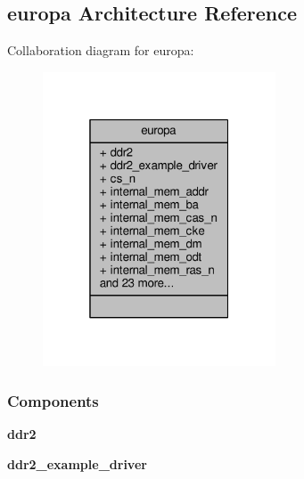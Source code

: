 \subsection{europa Architecture Reference}
\label{classddr2__example__top_1_1europa}


Collaboration diagram for europa\+:\nopagebreak
\begin{figure}[H]
\begin{center}
\leavevmode
\includegraphics[width=196pt]{de/d79/classddr2__example__top_1_1europa__coll__graph}
\end{center}
\end{figure}
\subsubsection*{Components}
 \begin{DoxyCompactItemize}
\item 
{\bf ddr2}  {\bfseries }  
\item 
{\bf ddr2\+\_\+example\+\_\+driver}  {\bfseries }  
\end{DoxyCompactItemize}
